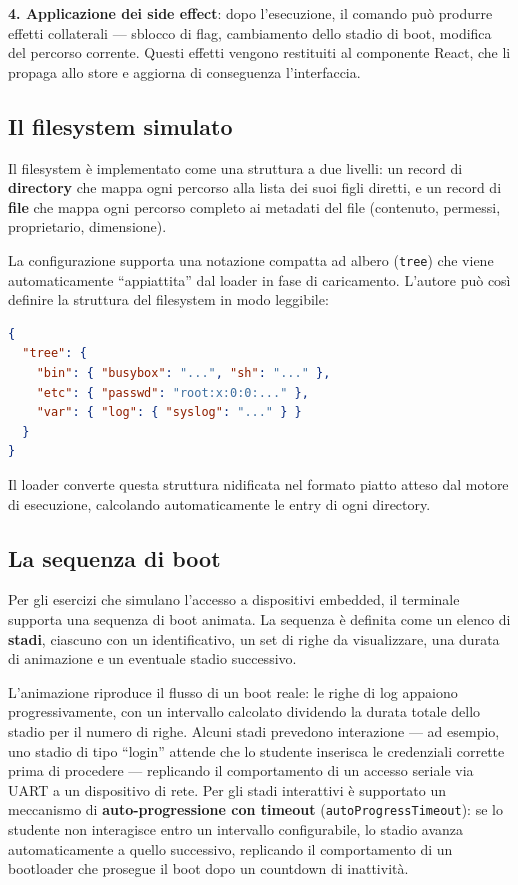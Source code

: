 \textbf{4. Applicazione dei side effect}: dopo l'esecuzione, il comando può produrre effetti collaterali --- sblocco di flag, cambiamento dello stadio di boot, modifica del percorso corrente. Questi effetti vengono restituiti al componente React, che li propaga allo store e aggiorna di conseguenza l'interfaccia.

\subsection{Il filesystem simulato}

Il filesystem è implementato come una struttura a due livelli: un record di \textbf{directory} che mappa ogni percorso alla lista dei suoi figli diretti, e un record di \textbf{file} che mappa ogni percorso completo ai metadati del file (contenuto, permessi, proprietario, dimensione).

La configurazione supporta una notazione compatta ad albero (\texttt{tree}) che viene automaticamente ``appiattita'' dal loader in fase di caricamento. L'autore può così definire la struttura del filesystem in modo leggibile:

\begin{lstlisting}[language=json]
{
  "tree": {
    "bin": { "busybox": "...", "sh": "..." },
    "etc": { "passwd": "root:x:0:0:..." },
    "var": { "log": { "syslog": "..." } }
  }
}
\end{lstlisting}

Il loader converte questa struttura nidificata nel formato piatto atteso dal motore di esecuzione, calcolando automaticamente le entry di ogni directory.

\subsection{La sequenza di boot}

Per gli esercizi che simulano l'accesso a dispositivi embedded, il terminale supporta una sequenza di boot animata. La sequenza è definita come un elenco di \textbf{stadi}, ciascuno con un identificativo, un set di righe da visualizzare, una durata di animazione e un eventuale stadio successivo.

L'animazione riproduce il flusso di un boot reale: le righe di log appaiono progressivamente, con un intervallo calcolato dividendo la durata totale dello stadio per il numero di righe. Alcuni stadi prevedono interazione --- ad esempio, uno stadio di tipo ``login'' attende che lo studente inserisca le credenziali corrette prima di procedere --- replicando il comportamento di un accesso seriale via UART a un dispositivo di rete. Per gli stadi interattivi è supportato un meccanismo di \textbf{auto-progressione con timeout} (\texttt{autoProgressTimeout}): se lo studente non interagisce entro un intervallo configurabile, lo stadio avanza automaticamente a quello successivo, replicando il comportamento di un bootloader che prosegue il boot dopo un countdown di inattività.


